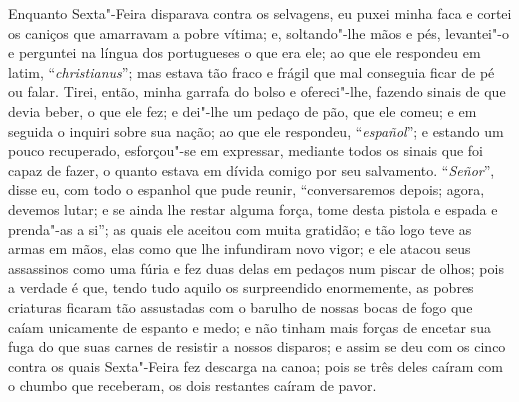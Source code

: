 Enquanto Sexta"-Feira disparava contra os selvagens, eu puxei minha faca
e cortei os caniços que amarravam a pobre vítima; e, soltando"-lhe mãos e
pés, levantei"-o e perguntei na língua dos portugueses o que era ele; ao
que ele respondeu em latim, ``\emph{christianus}''; mas estava tão fraco
e frágil que mal conseguia ficar de pé ou falar. Tirei, então, minha
garrafa do bolso e ofereci"-lhe, fazendo sinais de que devia beber, o que
ele fez; e dei"-lhe um pedaço de pão, que ele comeu; e em seguida o
inquiri sobre sua nação; ao que ele respondeu, ``\emph{español}''; e
estando um pouco recuperado, esforçou"-se em expressar, mediante todos os
sinais que foi capaz de fazer, o quanto estava em dívida comigo por seu
salvamento. ``\emph{Señor}'', disse eu, com todo o espanhol que pude
reunir, ``conversaremos depois; agora, devemos lutar; e se ainda lhe
restar alguma força, tome desta pistola e espada e prenda"-as a si''; as
quais ele aceitou com muita gratidão; e tão logo teve as armas em mãos,
elas como que lhe infundiram novo vigor; e ele atacou seus assassinos
como uma fúria e fez duas delas em pedaços num piscar de olhos; pois a
verdade é que, tendo tudo aquilo os surpreendido enormemente, as pobres
criaturas ficaram tão assustadas com o barulho de nossas bocas de fogo
que caíam unicamente de espanto e medo; e não tinham mais forças de
encetar sua fuga do que suas carnes de resistir a nossos disparos; e
assim se deu com os cinco contra os quais Sexta"-Feira fez descarga na
canoa; pois se três deles caíram com o chumbo que receberam, os dois
restantes caíram de pavor.


